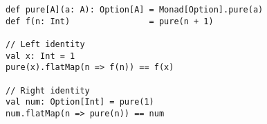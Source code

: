 \begin{algorithm}

\begin{verbatim}
def pure[A](a: A): Option[A] = Monad[Option].pure(a)
def f(n: Int)                = pure(n + 1)

// Left identity
val x: Int = 1
pure(x).flatMap(n => f(n)) == f(x)

// Right identity
val num: Option[Int] = pure(1)
num.flatMap(n => pure(n)) == num
\end{verbatim}

\caption{Monad identity laws in Scala %
\label{monad:laws:identity}}
\end{algorithm}